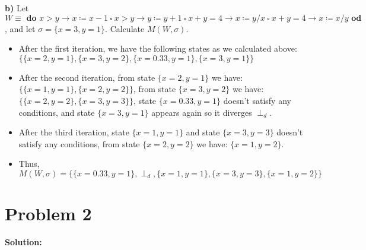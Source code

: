 \documentclass{article}
\begin{document}
\vspace{10pt}
\textbf{b)}  Let $ W \equiv \textbf{ do } x>y \rightarrow x \coloneqq x-1 \ \square \ x>y \rightarrow y \coloneqq y+1 \ \square \ x+y=4 \rightarrow x \coloneqq y/x \ \square \ x+y=4 \rightarrow x \coloneqq x/y \textbf{ od }$, and let $ \sigma = \{ x=3, y=1\} $. Calculate  $ M(W,\sigma) $.

\begin{itemize}
    \item After the first iteration, we have the following states as we calculated above: $\{\{x=2,y=1\},\{x=3,y=2\},\{x=0.33,y=1\},\{x=3,y=1\}\}$
    \item After the second iteration, from state $\{x=2,y=1\}$ we have: $\{\{x=1,y=1\},\{x=2,y=2\}\}$, from state $\{x=3,y=2\}$ we have: $\{\{x=2,y=2\},\{x=3,y=3\}\}$, state $\{x=0.33,y=1\}$ doesn't satisfy any conditions, and state $\{x=3,y=1\}$ appears again so it diverges $\perp_d$.
    \item After the third iteration, state $\{x=1,y=1\}$ and state $\{x=3,y=3\}$ doesn't satisfy any conditions, from state $\{x=2,y=2\}$ we have: $\{x=1,y=2\}$.
    \item Thus, $M(W,\sigma)=\{\{x=0.33,y=1\},\perp_d,\{x=1,y=1\},\{x=3,y=3\},\{x=1,y=2\}\}$
\end{itemize}

\section*{Problem 2}
\textbf{Solution:}
\end{document}
